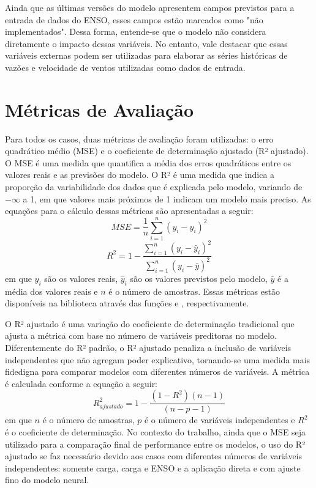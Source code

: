 Ainda que as últimas versões do modelo apresentem campos previstos para a entrada de dados do ENSO, esses campos
estão marcados como "não implementados". Dessa forma, entende-se que o modelo não considera diretamente o impacto 
dessas variáveis. No entanto, vale destacar que essas variáveis externas podem ser utilizadas para elaborar as séries históricas de 
vazões e velocidade de ventos utilizadas como dados de entrada. 


\newpage
\section{Métricas de Avaliação} %
Para todos os casos, duas métricas de avaliação foram utilizadas: o erro quadrático médio (MSE) e o coeficiente de determinação 
ajustado (R² ajustado). O MSE é uma medida que quantifica a média dos erros quadráticos entre os valores reais e as previsões 
do modelo. O R² é uma medida que indica a proporção da variabilidade dos dados que é explicada pelo modelo, variando de 
$ - \infty $ a 1, em que valores mais próximos de 1 indicam um modelo mais preciso. As equações para o cálculo dessas métricas
são apresentadas a seguir:
\begin{equation}
    \label{eq:mse}
    MSE = \frac{1}{n} \sum_{i=1}^{n} (y_i - \hat{y}_i)^2
\end{equation}
\begin{equation}
    \label{eq:r2}
    R^2 = 1 - \frac{\sum_{i=1}^{n} (y_i - \hat{y}_i)^2}{\sum_{i=1}^{n} (y_i - \bar{y})^2}
\end{equation}
em que $ y_i $ são os valores reais, $ \hat{y}_i $ são os valores previstos pelo modelo, $ \bar{y} $ é a média dos valores 
reais e $ n $ é o número de amostras. Essas métricas estão disponíveis na biblioteca  através das
funções  e , respectivamente.

O R² ajustado é uma variação do coeficiente de determinação tradicional que ajusta a métrica com base no número de variáveis preditoras 
no modelo. Diferentemente do R² padrão, o R² ajustado penaliza a inclusão de variáveis independentes que não agregam poder explicativo, 
tornando-se uma medida mais fidedigna para comparar modelos com diferentes números de variáveis. A métrica é calculada conforme a 
equação a seguir:
\begin{equation}
    \label{eq:r2_ajustado}
    R^2_{ajustado} = 1 -  \frac{\left(1 - R^2\right) \left(n - 1\right)}{\left(n - p - 1\right)}
\end{equation}
em que $n$ é o número de amostras, $ p $ é o número de variáveis independentes e $ R^2 $ é o coeficiente de determinação. No contexto do trabalho,
ainda que o MSE seja utilizado para a comparação final de performance entre os modelos, o uso do R² ajustado se faz necessário devido aos
casos com diferentes números de variáveis independentes: somente carga, carga e ENSO e a aplicação direta e com ajuste fino do modelo neural.

